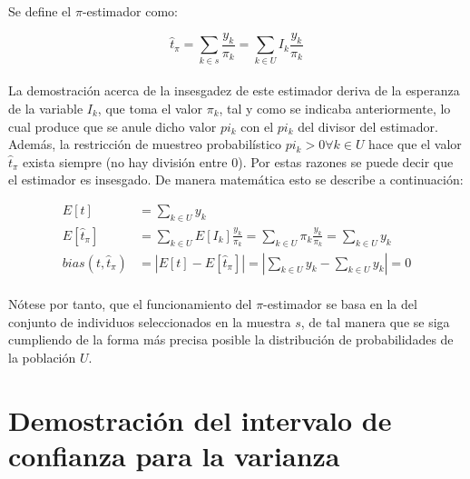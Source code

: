\documentclass{article}
\begin{document}
    \paragraph{}
    Se define el $\pi$-estimador como:

    \begin{equation}
      \widehat{t}_\pi = \sum_{k \in s} \frac{y_k}{\pi_k} = \sum_{k \in U} I_k \frac{y_k}{\pi_k}
    \end{equation}

    \paragraph{}
    La demostración acerca de la insesgadez de este estimador deriva de la esperanza de la variable $I_k$, que toma el valor $\pi_k$, tal y como se indicaba anteriormente, lo cual produce que se anule dicho valor $pi_k$ con el $pi_k$  del divisor del estimador. Además, la restricción de muestreo probabilístico $pi_k > 0 \forall k \in U$ hace que el valor $\widehat{t}_\pi$ exista siempre (no hay división entre 0). Por estas razones se puede decir que el estimador es insesgado. De manera matemática esto se describe a continuación:

    \begin{align}
      E[t] &= \sum_{k \in U} y_k \\
      E[\widehat{t}_\pi] &= \sum_{k \in U} E[I_k] \frac{y_k}{\pi_k} = \sum_{k \in U} \pi_k \frac{y_k}{\pi_k} =\sum_{k \in U} y_k \\
      bias(t, \widehat{t}_\pi) &= \left| E[t] - E[\widehat{t}_\pi] \right| = \left| \sum_{k \in U} y_k - \sum_{k \in U} y_k \right| = 0
    \end{align}

    \paragraph{}
    Nótese por tanto, que el funcionamiento del $\pi$-estimador se basa en la  del conjunto de individuos seleccionados en la muestra $s$, de tal manera que se siga cumpliendo de la forma más precisa posible la distribución de probabilidades de la población $U$.

  \section{Demostración del intervalo de confianza para la varianza}
  \label{sec:demostration_2}
\end{document}
